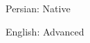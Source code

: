 

\begin{cventries}

\vspace{5mm}

  \begin{cvitems} %
    \item {Persian: Native}
    \item {English: Advanced}
   \end{cvitems}
    
\end{cventries}
